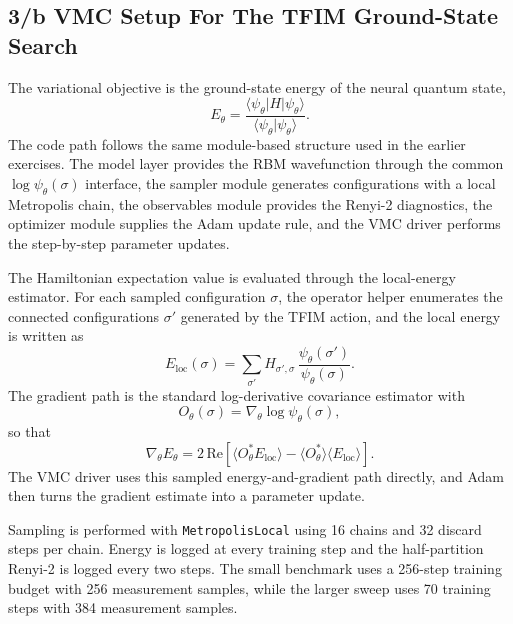 \documentclass[11pt,a4paper]{article}
\begin{document}
\subsection*{3/b VMC Setup For The TFIM Ground-State Search}

The variational objective is the ground-state energy of the neural quantum state,
\begin{equation}
    E_\theta = \frac{\langle \psi_\theta | H | \psi_\theta \rangle}{\langle \psi_\theta | \psi_\theta \rangle}.
\end{equation}
The code path follows the same module-based structure used in the earlier exercises. The model layer provides the RBM wavefunction through the common $\log \psi_\theta(\sigma)$ interface, the sampler module generates configurations with a local Metropolis chain, the observables module provides the Renyi-2 diagnostics, the optimizer module supplies the Adam update rule, and the VMC driver performs the step-by-step parameter updates.

The Hamiltonian expectation value is evaluated through the local-energy estimator. For each sampled configuration $\sigma$, the operator helper enumerates the connected configurations $\sigma'$ generated by the TFIM action, and the local energy is written as
\begin{equation}
    E_{\mathrm{loc}}(\sigma)
    =
    \sum_{\sigma'} H_{\sigma',\sigma}\,
    \frac{\psi_\theta(\sigma')}{\psi_\theta(\sigma)}.
\end{equation}
The gradient path is the standard log-derivative covariance estimator with
\begin{equation}
    O_\theta(\sigma) = \nabla_\theta \log \psi_\theta(\sigma),
\end{equation}
so that
\begin{equation}
    \nabla_\theta E_\theta
    =
    2\,\mathrm{Re}\!\left[
        \langle O_\theta^* E_{\mathrm{loc}} \rangle
        -
        \langle O_\theta^* \rangle
        \langle E_{\mathrm{loc}} \rangle
    \right].
\end{equation}
The VMC driver uses this sampled energy-and-gradient path directly, and Adam then turns the gradient estimate into a parameter update.

Sampling is performed with \texttt{MetropolisLocal} using 16 chains and 32 discard steps per chain. Energy is logged at every training step and the half-partition Renyi-2 is logged every two steps. The small benchmark uses a 256-step training budget with 256 measurement samples, while the larger sweep uses 70 training steps with 384 measurement samples.
\end{document}
